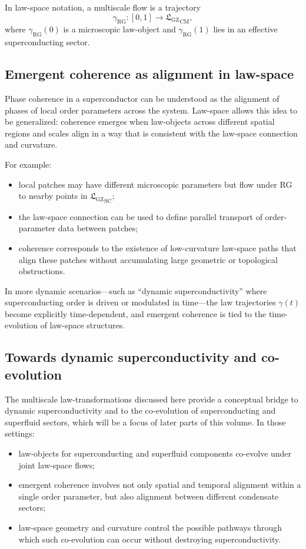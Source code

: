 \documentclass[11pt]{book}
\newcommand{\GZLS}{\ensuremath{\mathfrak{L}_{\mathrm{GZ}}}}
\theoremstyle{plain}
\theoremstyle{definition}
\theoremstyle{remark}
\begin{document}
In law-space notation, a multiscale flow is a trajectory
\[
   \gamma_{\mathrm{RG}} \colon [0,1] \to {\GZLS}_{\mathrm{CM}},
\]
where $\gamma_{\mathrm{RG}}(0)$ is a microscopic law-object and
$\gamma_{\mathrm{RG}}(1)$ lies in an effective superconducting
sector.

\subsection*{Emergent coherence as alignment in law-space}

Phase coherence in a superconductor can be understood as the
alignment of phases of local order parameters across the system.
Law-space allows this idea to be generalized: coherence emerges when
law-objects across different spatial regions and scales align in a
way that is consistent with the law-space connection and curvature.

For example:
\begin{itemize}
  \item local patches may have different microscopic parameters but
        flow under RG to nearby points in ${\GZLS}_{\mathrm{SC}}$;
  \item the law-space connection can be used to define parallel
        transport of order-parameter data between patches;
  \item coherence corresponds to the existence of low-curvature
        law-space paths that align these patches without accumulating
        large geometric or topological obstructions.
\end{itemize}

In more dynamic scenarios—such as ``dynamic superconductivity''
where superconducting order is driven or modulated in time—the law
trajectories $\gamma(t)$ become explicitly time-dependent, and
emergent coherence is tied to the time-evolution of law-space
structures.

\subsection*{Towards dynamic superconductivity and co-evolution}

The multiscale law-transformations discussed here provide a
conceptual bridge to dynamic superconductivity and to the co-evolution
of superconducting and superfluid sectors, which will be a focus of
later parts of this volume. In those settings:
\begin{itemize}
  \item law-objects for superconducting and superfluid components
        co-evolve under joint law-space flows;
  \item emergent coherence involves not only spatial and temporal
        alignment within a single order parameter, but also alignment
        between different condensate sectors;
  \item law-space geometry and curvature control the possible
        pathways through which such co-evolution can occur without
        destroying superconductivity.
\end{itemize}
\end{document}
